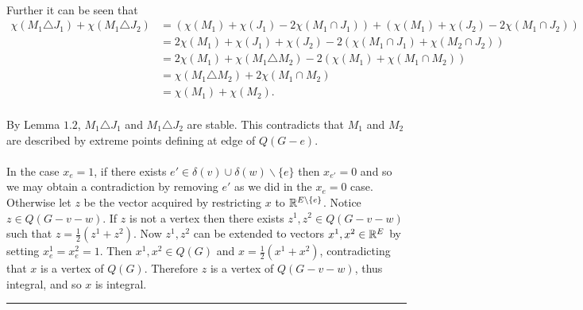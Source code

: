 \documentclass[letterpaper,12pt,oneside,onecolumn]{article}
\newenvironment{proof}{{\bf Proof:  }}{\hfill\rule{2mm}{2mm}}
\begin{document}
\begin{proof}
\paragraph{}
Further it can be seen that
\begin{align*}
\chi(M_1 \triangle J_1) + \chi(M_1 \triangle J_2) &= (\chi(M_1) + \chi(J_1) - 2\chi(M_1 \cap J_1)) + (\chi(M_1) + \chi(J_2) -2\chi(M_1 \cap J_2))\\
&=2\chi(M_1) + \chi(J_1) + \chi(J_2) -2(\chi(M_1 \cap J_1) + \chi(M_2 \cap J_2)) \\
&= 2\chi(M_1) + \chi(M_1 \triangle M_2) - 2(\chi(M_1) + \chi(M_1 \cap M_2)) \\
&= \chi(M_1 \triangle M_2) + 2\chi(M_1 \cap M_2) \\
&=\chi(M_1) + \chi(M_2).
\end{align*}
\paragraph{}By Lemma $1.2$, $M_1 \triangle J_1$ and $M_1 \triangle J_2$ are stable. This contradicts that $M_1$ and $M_2$ are described by extreme points defining at edge of $Q(G-e)$.
\paragraph{}
In the case $x_e = 1$, if there exists $e' \in \delta(v) \cup \delta(w) \backslash \{e\}$ then $x_{e'} = 0$ and so we may obtain a contradiction by removing $e'$ as we did in the $x_e = 0$ case. Otherwise let $z$ be the vector acquired by restricting $x$ to $\mathbb{R}^{E \backslash \{e\}}$. Notice $z \in Q(G - v - w)$. If $z$ is not a vertex then there exists $z^1, z^2 \in Q(G-v-w)$ such that $z = \frac{1}{2}(z^1 + z^2)$. Now $z^1,z^2$ can be extended to vectors $x^1, x^2 \in \mathbb{R}^{E}$ by setting $x^1_e=x^2_e = 1$. Then $x^1,x^2 \in Q(G)$ and $x = \frac{1}{2}(x^1 + x^2)$, contradicting that $x$ is a vertex of $Q(G)$. Therefore $z$ is a vertex of $Q(G-v-w)$, thus integral, and so $x$ is integral.
\end{proof}


\end{document}

